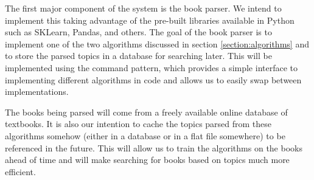 
The first major component of the system is the book parser.  
We intend to implement this taking advantage of the pre-built libraries available in Python such as SKLearn, Pandas, and others.  
The goal of the book parser is to implement one of the two algorithms discussed in section \ref{section:algorithms} and to store the parsed topics in a database for searching later.  
This will be implemented using the command pattern, which provides a simple interface to implementing different algorithms in code and allows us to easily swap between implementations.

The books being parsed will come from a freely available online database of textbooks.  
It is also our intention to cache the topics parsed from these algorithms somehow (either in a database or in a flat file somewhere) to be referenced in the future.  
This will allow us to train the algorithms on the books ahead of time and will make searching for books based on topics much more efficient. 